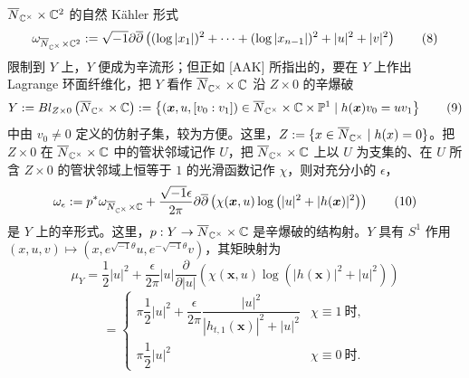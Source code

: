 $\overline{N}_{\mathbb{C}^\times}\times\mathbb{C}^2$ 的自然 K\"ahler 形式
\begin{equation}
\omega_{\overline{N}_{\mathbb{C}^\times}\times\mathbb{C}^2}
:=\sqrt{-1}\partial\overline{\partial}
\left((\log|x_1|)^2+\cdots+(\log|x_{n-1}|)^2+|u|^2+|v|^2\right)
\tag{8}
\end{equation}
\noindent 限制到 $Y$ 上，$Y$ 便成为辛流形；但正如 [AAK] 所指出的，要在 $Y$ 上作出 Lagrange 环面纤维化，把 $Y$ 看作 $\overline{N}_{\mathbb{C}^\times}\times\mathbb{C}$ 沿 $Z\times 0$ 的辛爆破
\begin{equation}
Y:=Bl_{Z\times 0}\left(\overline{N}_{\mathbb{C}^\times}\times\mathbb{C}\right)
:=\left\{(\bm{x},u,[v_0:v_1])\in\overline{N}_{\mathbb{C}^\times}\times\mathbb{C}\times\mathbb{P}^1\mid h(\bm{x})v_0=uv_1\right\}
\tag{9}
\end{equation}
\noindent 中由 $v_0\neq 0$ 定义的仿射子集，较为方便。这里，$Z:=\{x\in\overline{N}_{\mathbb{C}^\times}\mid h(x)=0\}$。把 $Z\times 0$ 在 $\overline{N}_{\mathbb{C}^\times}\times\mathbb{C}$ 中的管状邻域记作 $U$，把 $\overline{N}_{\mathbb{C}^\times}\times\mathbb{C}$ 上以 $U$ 为支集的、在 $U$ 所含 $Z\times 0$ 的管状邻域上恒等于 $1$ 的光滑函数记作 $\chi$，则对充分小的 $\epsilon$，
\begin{equation}
\omega_\epsilon:=p^*\omega_{\overline{N}_{\mathbb{C}^\times}\times\mathbb{C}}
+\frac{\sqrt{-1}\epsilon}{2\pi}\partial\overline{\partial}
\left(\chi(\bm{x},u)\log\left(|u|^2+|h(\bm{x})|^2\right)\right)
\tag{10}
\end{equation}
\noindent 是 $Y$ 上的辛形式。这里，$p:Y\to\overline{N}_{\mathbb{C}^\times}\times\mathbb{C}$ 是辛爆破的结构射。$Y$ 具有 $S^1$ 作用 $(x,u,v)\mapsto\left(x,e^{\sqrt{-1}\theta}u,e^{-\sqrt{-1}\theta}v\right)$，其矩映射为
\begin{equation}
\mu_Y=\frac{1}{2}|u|^2+\frac{\epsilon}{2\pi}|u|\frac{\partial}{\partial|u|}
\left(\chi(\bm{x},u)\log\left(|h(\bm{x})|^2+|u|^2\right)\right)
\tag{11}
\end{equation}
\begin{equation}
=\begin{cases}
\pi\dfrac{1}{2}|u|^2+\dfrac{\epsilon}{2\pi}\dfrac{|u|^2}{|h_{t,1}(\bm{x})|^2+|u|^2} & \chi\equiv 1\ \text{时},\\[2ex]
\pi\dfrac{1}{2}|u|^2 & \chi\equiv 0\ \text{时}.
\end{cases}
\tag{12}
\end{equation}
